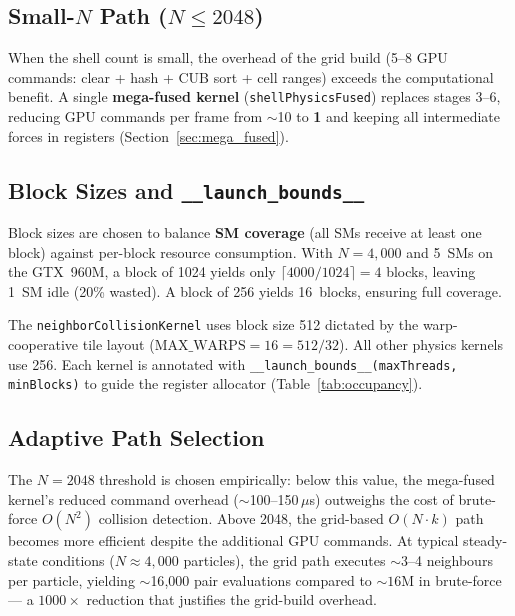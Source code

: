 \subsection{Small-$N$ Path ($N \leq 2048$)}
\label{sec:small_n}

When the shell count is small, the overhead of the grid build (5--8 GPU
commands: clear + hash + CUB sort + cell ranges) exceeds the computational
benefit. A single \textbf{mega-fused kernel} (\texttt{shellPhysicsFused})
replaces stages 3--6, reducing GPU commands per frame from $\sim$10 to
\textbf{1} and keeping all intermediate forces in registers
(Section~\ref{sec:mega_fused}).

\subsection{Block Sizes and \texttt{\_\_launch\_bounds\_\_}}
\label{sec:block_sizes}

Block sizes are chosen to balance \textbf{SM coverage} (all SMs receive at
least one block) against per-block resource consumption. With $N = 4{,}000$ and
5~SMs on the GTX~960M, a block of 1024 yields only $\lceil4000/1024\rceil = 4$
blocks, leaving 1~SM idle (20\% wasted). A block of 256 yields 16~blocks,
ensuring full coverage.

The \texttt{neighborCollisionKernel} uses block size 512 dictated by the
warp-cooperative tile layout ($\text{MAX\_WARPS} = 16 = 512/32$). All other
physics kernels use 256. Each kernel is annotated with
\texttt{\_\_launch\_bounds\_\_(maxThreads, minBlocks)} to guide the register
allocator (Table~\ref{tab:occupancy}).

\subsection{Adaptive Path Selection}
\label{sec:adaptive_path}

The $N = 2048$ threshold is chosen empirically: below this value, the
mega-fused kernel's reduced command overhead ($\sim$100--150\,$\mu$s) outweighs
the cost of brute-force $O(N^2)$ collision detection. Above 2048, the grid-based
$O(N \cdot k)$ path becomes more efficient despite the additional GPU commands.
At typical steady-state conditions ($N \approx 4{,}000$ particles), the grid path
executes $\sim$3--4 neighbours per particle, yielding $\sim$16{,}000 pair
evaluations compared to $\sim 16\text{M}$ in brute-force --- a $1000\times$
reduction that justifies the grid-build overhead.
